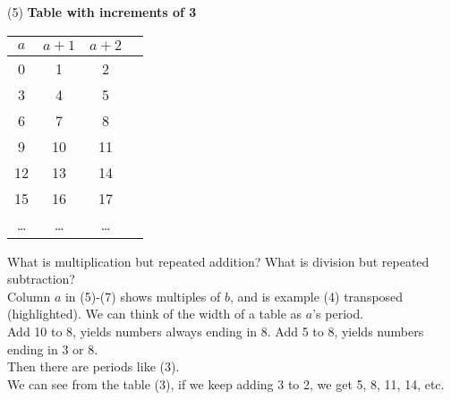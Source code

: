 \begin{minipage}{0.45\textwidth}

    (5) \textbf{Table with increments of 3}\\
    \begin{tabular}{c|ccc}
        $a$                       & $a+1$ & $a+2$ \\
        \hline
        \rowcolor{OliveGreen!10}0 & 1     & 2     \\
        \rowcolor{OliveGreen!10}3 & 4     & 5     \\
        \rowcolor{OliveGreen!10}6 & 7     & 8     \\
        9                         & 10    & 11    \\
        12                        & 13    & 14    \\
        15                        & 16    & 17    \\
        \dots                     & \dots & \dots \\
    \end{tabular}
\end{minipage}%
\hspace{0.05\textwidth} %
\begin{minipage}{0.5\textwidth}
    What is multiplication but repeated addition?
    What is division but repeated subtraction?\\

    \noindent
    Column $a$ in (5)-(7) shows multiples of $b$, and is
    example (4) transposed (highlighted). We can think
    of the width of a table as $a$'s period.\\

    \noindent
    Add 10 to 8, yields numbers always ending in 8.
    Add 5 to 8, yields numbers ending in 3 or 8.\\
    Then there are periods like (3).\\

    \noindent
    We can see from the table (3), if we keep adding 3 to 2,
    we get 5, 8, 11, 14, etc.\\

\end{minipage}

\vspace{0.5cm} %


